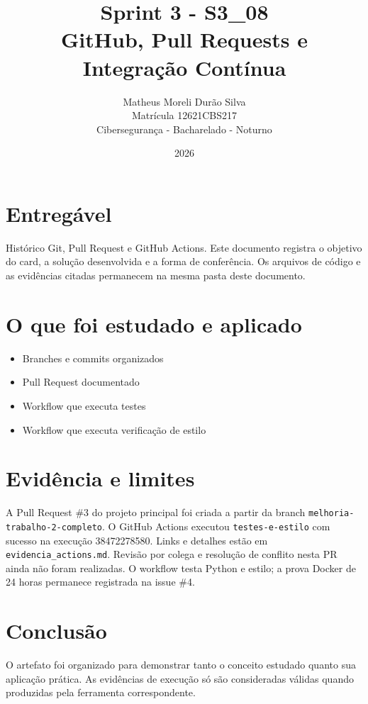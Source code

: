 \documentclass[12pt]{article}
\title{Sprint 3 - S3\_08\\GitHub, Pull Requests e Integração Contínua}
\author{Matheus Moreli Durão Silva\\Matrícula 12621CBS217\\Cibersegurança - Bacharelado - Noturno}
\date{2026}
\begin{document}
\maketitle

\section*{Entregável}
Histórico Git, Pull Request e GitHub Actions. Este documento registra o objetivo do card, a solução desenvolvida e a forma de conferência. Os arquivos de código e as evidências citadas permanecem na mesma pasta deste documento.

\section*{O que foi estudado e aplicado}
\begin{itemize}
\item Branches e commits organizados
\item Pull Request documentado
\item Workflow que executa testes
\item Workflow que executa verificação de estilo
\end{itemize}

\section*{Evidência e limites}
A Pull Request \#3 do projeto principal foi criada a partir da branch \texttt{melhoria-trabalho-2-completo}. O GitHub Actions executou \texttt{testes-e-estilo} com sucesso na execução 38472278580. Links e detalhes estão em \texttt{evidencia\_actions.md}. Revisão por colega e resolução de conflito nesta PR ainda não foram realizadas. O workflow testa Python e estilo; a prova Docker de 24 horas permanece registrada na issue \#4.

\section*{Conclusão}
O artefato foi organizado para demonstrar tanto o conceito estudado quanto sua aplicação prática. As evidências de execução só são consideradas válidas quando produzidas pela ferramenta correspondente.
\end{document}
